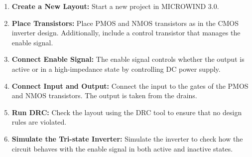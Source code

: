 \documentclass[a4paper,12pt]{article}
\begin{document}
\begin{enumerate}
	\item \textbf{Create a New Layout:} Start a new project in MICROWIND 3.0.
	\item \textbf{Place Transistors:} Place PMOS and NMOS transistors as in the CMOS inverter design. Additionally, include a control transistor that manages the enable signal.
	\item \textbf{Connect Enable Signal:} The enable signal controls whether the output is active or in a high-impedance state by controlling DC power supply.
	\item \textbf{Connect Input and Output:} Connect the input to the gates of the PMOS and NMOS transistors. The output is taken from the drains.
	\item \textbf{Run DRC:} Check the layout using the DRC tool to ensure that no design rules are violated.
	\item \textbf{Simulate the Tri-state Inverter:} Simulate the inverter to check how the circuit behaves with the enable signal in both active and inactive states.
\end{enumerate}



\newpage
\end{document}
